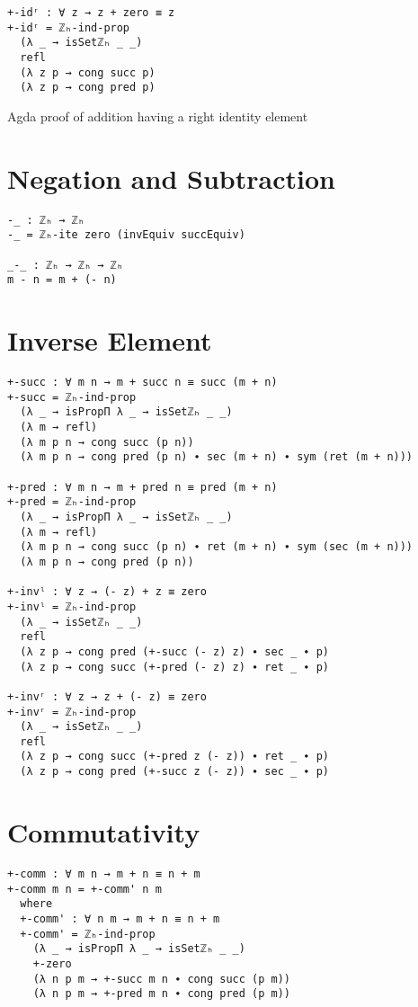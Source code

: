 \begin{listing}[H]
\begin{verbatim}
+-idʳ : ∀ z → z + zero ≡ z
+-idʳ = ℤₕ-ind-prop
  (λ _ → isSetℤₕ _ _)
  refl
  (λ z p → cong succ p)
  (λ z p → cong pred p)
\end{verbatim}
\caption{Agda proof of addition having a right identity element}
\end{listing}

\section{Negation and Subtraction}
\begin{verbatim}
-_ : ℤₕ → ℤₕ
-_ = ℤₕ-ite zero (invEquiv succEquiv)

_-_ : ℤₕ → ℤₕ → ℤₕ
m - n = m + (- n)
\end{verbatim}

\section{Inverse Element}
\begin{verbatim}
+-succ : ∀ m n → m + succ n ≡ succ (m + n)
+-succ = ℤₕ-ind-prop
  (λ _ → isPropΠ λ _ → isSetℤₕ _ _)
  (λ m → refl)
  (λ m p n → cong succ (p n))
  (λ m p n → cong pred (p n) ∙ sec (m + n) ∙ sym (ret (m + n)))

+-pred : ∀ m n → m + pred n ≡ pred (m + n)
+-pred = ℤₕ-ind-prop
  (λ _ → isPropΠ λ _ → isSetℤₕ _ _)
  (λ m → refl)
  (λ m p n → cong succ (p n) ∙ ret (m + n) ∙ sym (sec (m + n)))
  (λ m p n → cong pred (p n))

+-invˡ : ∀ z → (- z) + z ≡ zero
+-invˡ = ℤₕ-ind-prop
  (λ _ → isSetℤₕ _ _)
  refl
  (λ z p → cong pred (+-succ (- z) z) ∙ sec _ ∙ p)
  (λ z p → cong succ (+-pred (- z) z) ∙ ret _ ∙ p)

+-invʳ : ∀ z → z + (- z) ≡ zero
+-invʳ = ℤₕ-ind-prop
  (λ _ → isSetℤₕ _ _)
  refl
  (λ z p → cong succ (+-pred z (- z)) ∙ ret _ ∙ p)
  (λ z p → cong pred (+-succ z (- z)) ∙ sec _ ∙ p)
\end{verbatim}

\section{Commutativity}
\begin{verbatim}
+-comm : ∀ m n → m + n ≡ n + m
+-comm m n = +-comm' n m
  where
  +-comm' : ∀ n m → m + n ≡ n + m
  +-comm' = ℤₕ-ind-prop
    (λ _ → isPropΠ λ _ → isSetℤₕ _ _)
    +-zero
    (λ n p m → +-succ m n ∙ cong succ (p m))
    (λ n p m → +-pred m n ∙ cong pred (p m))
\end{verbatim}
